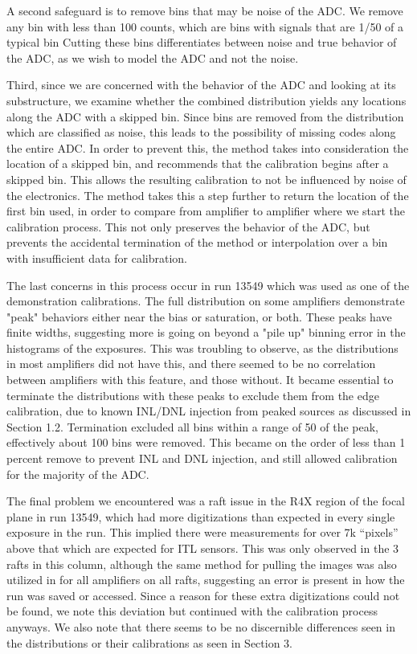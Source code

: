 \documentclass[11pt, letterpaper]{article}
\begin{document}
A second safeguard is to remove bins that may be noise of the ADC. 
We remove any bin with less than 100 counts, which are bins with signals that are 1/50 of a typical bin
Cutting these bins differentiates between noise and true behavior of the ADC, as we wish to model the ADC and not the noise. 
\indent


Third, since we are concerned with the behavior of the ADC and looking at its substructure, we examine whether the combined distribution yields any locations along the ADC with a skipped bin. 
Since bins are removed from the distribution which are classified as noise, this leads to the possibility of missing codes along the entire ADC. 
In order to prevent this, the method takes into consideration the location of a skipped bin, and recommends that the calibration begins after a skipped bin. 
This allows the resulting calibration to not be influenced by noise of the electronics. 
The method takes this a step further to return the location of the first bin used, in order to compare from amplifier to amplifier where we start the calibration process. 
This not only preserves the behavior of the ADC, but prevents the accidental termination of the method or interpolation over a bin with insufficient data for calibration. 
\indent 


The last concerns in this process occur in run 13549 which was used as one of the demonstration calibrations. 
The full distribution on some amplifiers demonstrate "peak" behaviors either near the bias or saturation, or both. 
These peaks have finite widths, suggesting more is going on beyond a "pile up" binning error in the histograms of the exposures. 
This was troubling to observe, as the distributions in most amplifiers did not have this, and there seemed to be no correlation between amplifiers with this feature, and those without. 
It became essential to terminate the distributions with these peaks to exclude them from the edge calibration, due to known INL/DNL injection from peaked sources as discussed in Section 1.2. 
Termination excluded all bins within a range of 50 of the peak, effectively about 100 bins were removed. 
This became on the order of less than 1 percent remove to prevent INL and DNL injection, and still allowed calibration for the majority of the ADC. 
\indent


The final problem we encountered was a raft issue in the R4X region of the focal plane in run 13549, which had more digitizations than expected in every single exposure in the run. 
This implied there were measurements for over 7k “pixels” above that which are expected for ITL sensors. 
This was only observed in the 3 rafts in this column, although the same method for pulling the images was also utilized in for all amplifiers on all rafts, suggesting an error is present in how the run was saved or accessed. 
Since a reason for these extra digitizations could not be found, we note this deviation but continued with the calibration process anyways. 
We also note that there seems to be no discernible differences seen in the distributions or their calibrations as seen in Section 3. 
\end{document}
